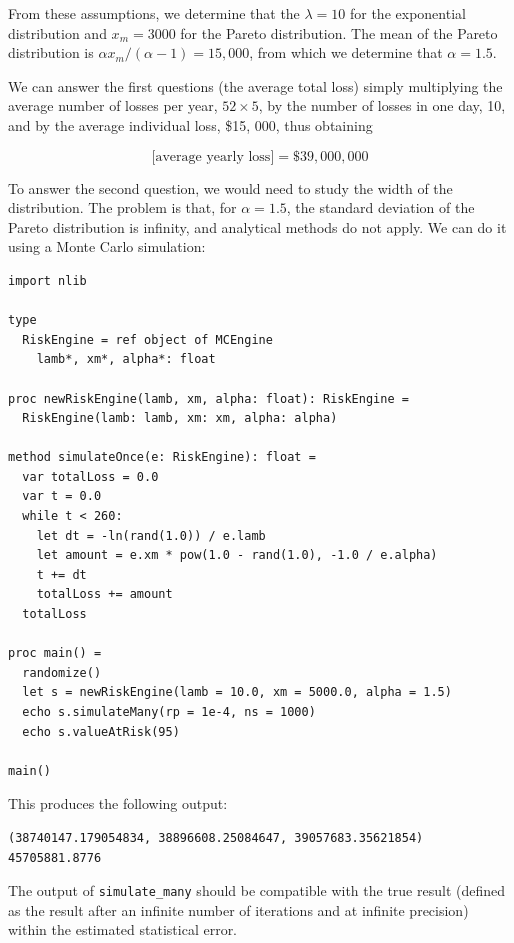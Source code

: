 \documentclass[justified, sixbynine]{tufte-book}
\def\ft{\small\tt}
\theoremstyle{plain}%
\newtheorem * {corollary}{Corollary}
\theoremstyle{definition}
\theoremstyle{remark}
\newtheorem * {remark}{Remark}
\newtheorem * {note}{Note}
\begin{document}
\begin{fullwidth}
From these assumptions, we determine that the $\lambda=10$ for the exponential distribution and $x_m=3000$ for the Pareto distribution. The mean of the Pareto distribution is $\alpha x_m/(\alpha-1) = 15, 000$, from which we determine that $\alpha = 1.5$.

We can answer the first questions (the average total loss) simply multiplying the average number of losses per year, $52\times5$, by the number of losses in one day, 10, and by the average individual loss, \$15, 000, thus obtaining

\begin{equation}
\textrm{[average yearly loss]} = \$39, 000, 000
\end{equation}

To answer the second question, we would need to study the width of the distribution. The problem is that, for $\alpha=1.5$, the standard deviation of the Pareto distribution is infinity, and analytical methods do not apply. We can do it using a Monte Carlo simulation:


\begin{lstlisting}[caption={in file: {\ft risk.nim}}]
import nlib

type
  RiskEngine = ref object of MCEngine
    lamb*, xm*, alpha*: float

proc newRiskEngine(lamb, xm, alpha: float): RiskEngine =
  RiskEngine(lamb: lamb, xm: xm, alpha: alpha)

method simulateOnce(e: RiskEngine): float =
  var totalLoss = 0.0
  var t = 0.0
  while t < 260:
    let dt = -ln(rand(1.0)) / e.lamb
    let amount = e.xm * pow(1.0 - rand(1.0), -1.0 / e.alpha)
    t += dt
    totalLoss += amount
  totalLoss

proc main() =
  randomize()
  let s = newRiskEngine(lamb = 10.0, xm = 5000.0, alpha = 1.5)
  echo s.simulateMany(rp = 1e-4, ns = 1000)
  echo s.valueAtRisk(95)

main()
\end{lstlisting}

This produces the following output:

\begin{lstlisting}
(38740147.179054834, 38896608.25084647, 39057683.35621854)
45705881.8776
\end{lstlisting}

The output of {\ft simulate\_many} should be compatible with the true result (defined as the result after an infinite number of iterations and at infinite precision) within the estimated statistical error.


\end{fullwidth}
\end{document}
